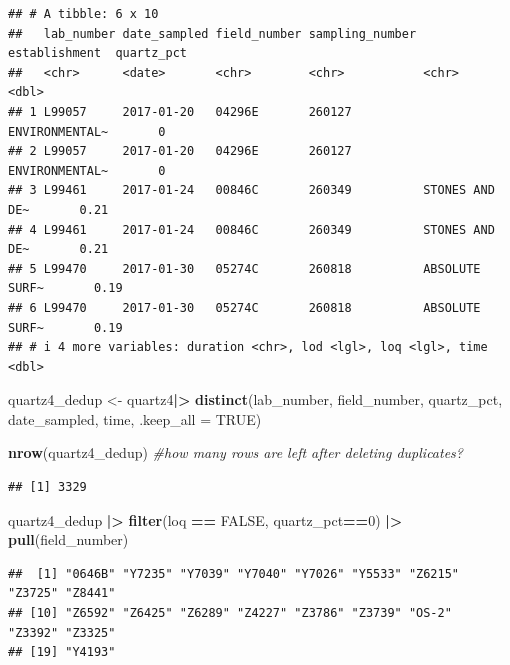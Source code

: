 \documentclass[
]{article}
\newenvironment{Shaded}{\begin{snugshade}}{\end{snugshade}}
\newcommand{\AttributeTok}[1]{\textcolor[rgb]{0.13,0.29,0.53}{#1}}
\newcommand{\CommentTok}[1]{\textcolor[rgb]{0.56,0.35,0.01}{\textit{#1}}}
\newcommand{\ConstantTok}[1]{\textcolor[rgb]{0.56,0.35,0.01}{#1}}
\newcommand{\DecValTok}[1]{\textcolor[rgb]{0.00,0.00,0.81}{#1}}
\newcommand{\FunctionTok}[1]{\textcolor[rgb]{0.13,0.29,0.53}{\textbf{#1}}}
\newcommand{\NormalTok}[1]{#1}
\newcommand{\OtherTok}[1]{\textcolor[rgb]{0.56,0.35,0.01}{#1}}
\newcommand{\SpecialCharTok}[1]{\textcolor[rgb]{0.81,0.36,0.00}{\textbf{#1}}}
\begin{document}
\begin{verbatim}
## # A tibble: 6 x 10
##   lab_number date_sampled field_number sampling_number establishment  quartz_pct
##   <chr>      <date>       <chr>        <chr>           <chr>               <dbl>
## 1 L99057     2017-01-20   04296E       260127          ENVIRONMENTAL~       0   
## 2 L99057     2017-01-20   04296E       260127          ENVIRONMENTAL~       0   
## 3 L99461     2017-01-24   00846C       260349          STONES AND DE~       0.21
## 4 L99461     2017-01-24   00846C       260349          STONES AND DE~       0.21
## 5 L99470     2017-01-30   05274C       260818          ABSOLUTE SURF~       0.19
## 6 L99470     2017-01-30   05274C       260818          ABSOLUTE SURF~       0.19
## # i 4 more variables: duration <chr>, lod <lgl>, loq <lgl>, time <dbl>
\end{verbatim}

\begin{Shaded}
\begin{Highlighting}[]
\NormalTok{quartz4\_dedup }\OtherTok{\textless{}{-}}\NormalTok{ quartz4}\SpecialCharTok{|\textgreater{}} 
  \FunctionTok{distinct}\NormalTok{(lab\_number, field\_number, quartz\_pct, date\_sampled, time,}
           \AttributeTok{.keep\_all =} \ConstantTok{TRUE}\NormalTok{) }

\FunctionTok{nrow}\NormalTok{(quartz4\_dedup) }\CommentTok{\#how many rows are left after deleting duplicates?  }
\end{Highlighting}
\end{Shaded}

\begin{verbatim}
## [1] 3329
\end{verbatim}

\begin{Shaded}
\begin{Highlighting}[]
\NormalTok{quartz4\_dedup }\SpecialCharTok{|\textgreater{}} 
  \FunctionTok{filter}\NormalTok{(loq }\SpecialCharTok{==} \ConstantTok{FALSE}\NormalTok{, }
\NormalTok{         quartz\_pct}\SpecialCharTok{==}\DecValTok{0}\NormalTok{) }\SpecialCharTok{|\textgreater{}} 
  \FunctionTok{pull}\NormalTok{(field\_number)}
\end{Highlighting}
\end{Shaded}

\begin{verbatim}
##  [1] "0646B" "Y7235" "Y7039" "Y7040" "Y7026" "Y5533" "Z6215" "Z3725" "Z8441"
## [10] "Z6592" "Z6425" "Z6289" "Z4227" "Z3786" "Z3739" "OS-2"  "Z3392" "Z3325"
## [19] "Y4193"
\end{verbatim}
\end{document}
